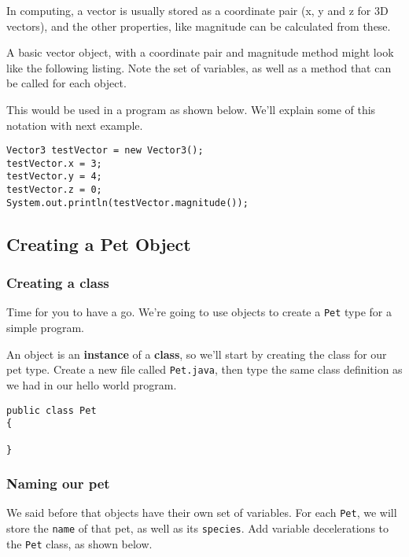 		In computing, a vector is usually stored as a coordinate pair (x, y and z for 3D vectors), and the other properties, like magnitude can be calculated from these.
		
		A basic vector object, with a coordinate pair and magnitude method might look like the following listing. Note the set of variables, as well as a method that can be called for each object.
		
		
		
		This would be used in a program as shown below. We'll explain some of this notation with next example.
		
		\begin{lstlisting}[style=Java, numbers=none]
Vector3 testVector = new Vector3();
testVector.x = 3;
testVector.y = 4;
testVector.z = 0;
System.out.println(testVector.magnitude());
		\end{lstlisting}
	
	
	\subsection{Creating a Pet Object}

		\subsubsection{Creating a class}
		
			Time for you to have a go. We're going to use objects to create a \texttt{Pet} type for a simple program.
			
			An object is an \textbf{instance} of a \textbf{class}, so we'll start by creating the class for our pet type.
			Create a new file called \texttt{Pet.java}, then type the same class definition as we had in our hello world program.
			
			\begin{lstlisting}[style=Java]
public class Pet
{

}
			\end{lstlisting}
		
		\subsubsection{Naming our pet}
		
			We said before that objects have their own set of variables. For each \texttt{Pet}, we will store the \texttt{name} of that pet, as well as its \texttt{species}. Add variable decelerations to the \texttt{Pet} class, as shown below.
			
